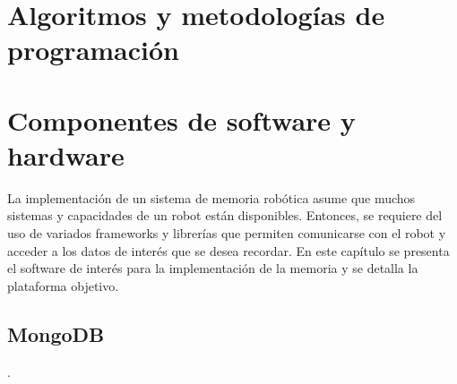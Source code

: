 




\section{Algoritmos y metodologías de programación}


\section{Componentes de software y hardware}
La implementación de un sistema de memoria robótica asume que muchos sistemas y capacidades de un robot están disponibles. Entonces, se requiere del uso de variados frameworks y librerías que permiten comunicarse con el robot y acceder a los datos de interés que se desea recordar. En este capítulo se presenta el software de interés para la implementación de la memoria y se detalla la plataforma objetivo.

\subsection{MongoDB}
% 
.


